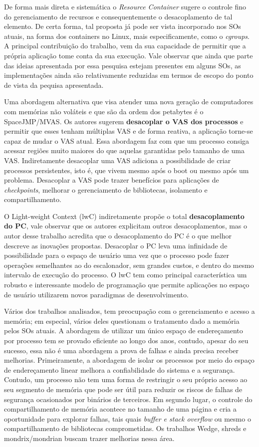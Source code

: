 De forma mais direta e sistemática o \textit{Resource Container} sugere o
controle fino do gerenciamento de recursos e consequentemente o desacoplamento
de tal elemento. De certa forma, tal proposta já pode ser vista incorporado nos
SOs atuais, na forma dos containers no Linux, mais especificamente, como o
\textit{cgroups}. A principal contribuição do trabalho, vem da sua capacidade
de permitir que a própria aplicação tome conta da sua execução.  Vale observar
que ainda que parte das ideias apresentada por essa pesquisa estejam presentes
em alguns SOs, as implementações ainda são relativamente reduzidas em termos de
escopo do ponto de vista da pequisa apresentada.

Uma abordagem alternativa que visa atender uma nova geração de computadores com
memórias não voláteis e que são da ordem dos petabytes é o SpaceJMP/MVAS.  Os
autores sugerem \textbf{desacoplar o VAS dos processos} e permitir que esses
tenham múltiplas VAS e de forma reativa, a aplicação torne-se capaz de mudar o
VAS atual. Essa abordagem faz com que um processo consiga acessar regiões muito
maiores do que aquelas garantidas pelo tamanho de uma VAS. Indiretamente
desacoplar uma VAS adiciona a possibilidade de criar processos persistentes,
isto é, que vivem mesmo após o boot ou mesmo após um problema. Desacoplar a VAS
pode trazer benefícios para aplicações de \textit{checkpoints}, melhorar o
gerenciamento de bibliotecas, isolamento e compartilhamento.

O Light-weight Context (lwC) indiretamente propõe o total
\textbf{desacoplamento do PC}, vale observar que os autores explicitam outros
desacoplamentos, mas o autor desse trabalho acredita que o desacoplamento do PC
é o que melhor descreve as inovações propostas. Desacoplar o PC leva uma
infinidade de possibilidade para o espaço de usuário uma vez que o processo
pode fazer operações semelhantes ao do escalonador, sem grandes custos, e
dentro do mesmo intervalo de execução do processo. O lwC tem como principal
característica um robusto e interessante modelo de programação que permite
aplicações no espaço de usuário utilizarem novos paradigmas de desenvolvimento.

Vários dos trabalhos analisados, tem preocupação com o gerenciamento e acesso a
memória; em especial, vários deles questionam o tratamento dado a memória pelos
SOs atuais.  A abordagem de utilizar um único espaço de endereçamento por
processo tem se provado eficiente ao longo dos anos, contudo, apesar do seu
sucesso, essa não é uma abordagem a prova de falhas e ainda precisa receber
melhorias.  Primeiramente, a abordagem de isolar os processos por meio do
espaço de endereçamento linear melhora a confiabilidade do sistema e a
segurança.  Contudo, um processo não tem uma forma de restringir o seu próprio
acesso ao seu segmento de memória que pode ser útil para reduzir os riscos de
falhas de segurança ocasionados por binários de terceiros. Em segundo lugar, o
controle do compartilhamento de memória acontece no tamanho de uma página e
cria a oportunidade para explorar falhas, tais quais \emph{buffer e stack
overflow} ou mesmo o compartilhamento de bibliotecas comprometidas. Os
trabalhos Wedge, shreds e mondrix/mondrian buscam trazer melhorias nessa área.

